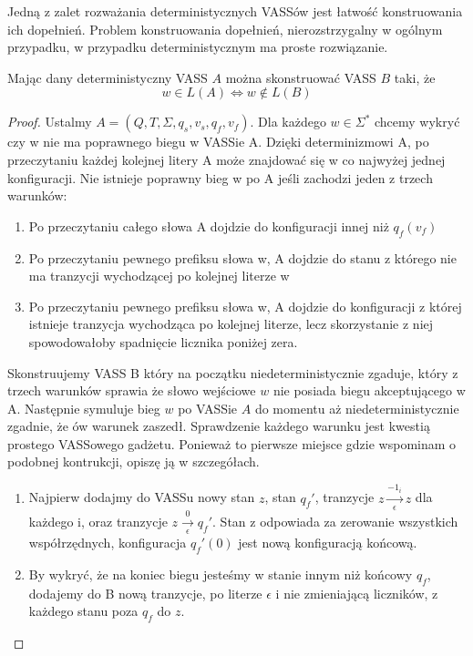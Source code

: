     Jedną z zalet rozważania deterministycznych VASSów jest łatwość konstruowania ich dopełnień.
    Problem konstruowania dopełnień, nierozstrzygalny w ogólnym przypadku, w przypadku deterministycznym ma proste rozwiązanie.


    \begin{lemma}
        \label{det-closure}
        Mając dany deterministyczny VASS $A$ można skonstruować VASS $B$ taki, że
        \[w \in L(A) \Leftrightarrow w \notin L(B)\]
    \end{lemma}
    \begin{proof}
        Ustalmy $A = (Q,T,\Sigma,q_s,v_s,q_f,v_f)$.
        Dla każdego $w \in \Sigma^*$ chcemy wykryć czy w nie ma poprawnego biegu w VASSie A.
        Dzięki determinizmowi A, po przeczytaniu każdej kolejnej litery A może znajdować się w co najwyżej jednej konfiguracji.
        Nie istnieje poprawny bieg w po A jeśli zachodzi jeden z trzech warunków:
        \begin{enumerate}
            \item Po przeczytaniu całego słowa A dojdzie do konfiguracji innej niż $q_f(v_f)$
            \item Po przeczytaniu pewnego prefiksu słowa w, A dojdzie do stanu z którego nie ma tranzycji wychodzącej po kolejnej literze w
            \item Po przeczytaniu pewnego prefiksu słowa w, A dojdzie do konfiguracji z której istnieje tranzycja wychodząca po kolejnej literze,
            lecz skorzystanie z niej spowodowałoby spadnięcie licznika poniżej zera.
        \end{enumerate}

        Skonstruujemy VASS B który na początku niedeterministycznie zgaduje, który z trzech warunków sprawia że słowo wejściowe $w$
        nie posiada biegu akceptującego w A.
        Następnie symuluje bieg $w$ po VASSie $A$ do momentu aż niedeterministycznie zgadnie, że ów warunek zaszedł.
        Sprawdzenie każdego warunku jest kwestią prostego VASSowego gadżetu.
        Ponieważ to pierwsze miejsce gdzie wspominam o podobnej kontrukcji, opiszę ją w szczegółach.
        \begin{enumerate}
            \item Najpierw dodajmy do VASSu nowy stan $z$, stan $q_f'$, tranzycje $z \xrightarrow[\epsilon]{-1_i} z$ dla każdego i,
            oraz tranzycje $z \xrightarrow[\epsilon]{0} q_f'$.
            Stan z odpowiada za zerowanie wszystkich współrzędnych,
            konfiguracja $q_f'(0)$ jest nową konfiguracją końcową.
            \item By wykryć, że na koniec biegu jesteśmy w stanie innym niż końcowy $q_f$, dodajemy do B nową tranzycje,
            po literze $\epsilon$ i nie zmieniającą liczników, z każdego stanu poza $q_f$ do $z$.



\end{enumerate}
\end{proof}

